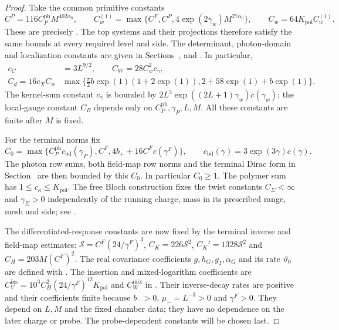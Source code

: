 \begin{proof}
Take the common primitive constants
\[
 C^P=116C_P^{\mathrm{ph}}M^{402\alpha_0},\qquad
 C_w^{(1)}=\max\{C^F,C^P,4\exp(2\gamma_w)M^{27\alpha_0}\},
 \qquad C_w=64K_{\mathrm{pol}}C_w^{(1)}.
\]
These are precisely .
The top systems and their projections therefore satisfy
the same bounds at every required level and side.
The determinant, photon-domain and localization constants
are given in Sections~,
 and
. In particular,
\[
 \begin{aligned}
 c_C&=3L^{9/2},\qquad C_W=28C_w^2c_\gamma,\\
 C_d=16c_XC_w
       &\max\{\tfrac\pi2b\exp(1)(1+2\exp(1)),
                                      2+58\exp(1)+b\exp(1)\}.
 \end{aligned}
\]
The kernel-sum constant $c_\gamma$ is bounded by
$2L^3\exp((2L+1)\gamma_w)c(\gamma_w)$;
the local-gauge constant $C_B$ depends only on
$C_P^{\mathrm{ph}},\gamma_P,L,M$.
All these constants are finite after $M$ is fixed.

For the terminal norms fix
\begin{equation}\label{eq:constants-terminal-calibration}
 C_0=\max\{C_P^{\mathrm{ph}}c_{\mathrm{bd}}(\gamma_P),
                 C^F,4b_++16C^Fc(\gamma^F)\},
 \qquad c_{\mathrm{bd}}(\gamma)=3\exp(3\gamma)c(\gamma).
\end{equation}
The photon row sums, both field-map row norms and the
terminal Dirac form in
Section~ are then
bounded by this $C_0$. In particular $C_0\ge1$.
The polymer sum has $1\le c_\kappa\le K_{\mathrm{pol}}$.
The free Bloch construction fixes the twist constants
$C_\Sigma<\infty$ and $\gamma_\Sigma>0$ independently of
the running charge, mass in its prescribed range, mesh
and side; see .

The differentiated-response constants are now fixed by
the terminal inverse and field-map estimates:
$\mathcal S=C^F(24/\gamma^F)^3$,
$C_K=226\mathcal S^2$, $C_K'=1328\mathcal S^2$ and
$C_H=203M(C^F)^2$. The real covariance coefficients
$g,h_G,g_1,\alpha_G$ and its rate $\vartheta_0$ are
defined with .
The insertion and mixed-logarithm coefficients are
$C_V^{\mathrm{ins}}=10^3C_H^2(24/\gamma^F)^{12}K_{\mathrm{pol}}$ and
$C_W^{\mathrm{mix}}$ in .
Their inverse-decay rates are positive and their
coefficients finite because $b_->0$,
$\mu_-=L^{-3}>0$ and $\gamma^F>0$.
They depend on $L,M$ and the fixed chamber data;
they have no dependence on the later charge or probe.
The probe-dependent constants will be chosen last.


\end{proof}
